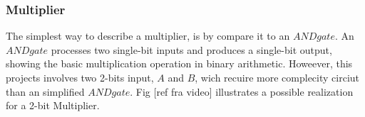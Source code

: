 \subsubsection{Multiplier}
The simplest way to describe a multiplier, is by compare it to an $AND  gate$. An $AND gate$ processes two single-bit inputs and produces a single-bit output, showing the basic multiplication operation in binary arithmetic. Howeever, this projects involves two 2-bits input, $A$ and $B$, wich recuire more complecity circiut than an simplified $AND gate$. Fig [ref fra video] illustrates a possible realization for a 2-bit Multiplier.

